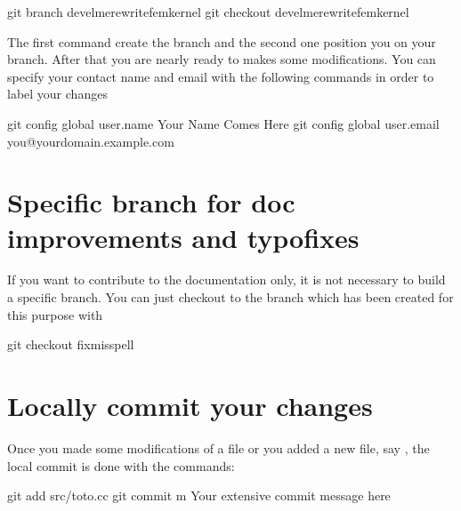 \documentclass[a4paper,11pt,english]{sphinxmanual}
\begin{document}
\begin{sphinxVerbatim}[commandchars=\\\{\}]
git branch devel\PYGZhy{}me\PYGZhy{}rewrite\PYGZhy{}fem\PYGZhy{}kernel
git checkout devel\PYGZhy{}me\PYGZhy{}rewrite\PYGZhy{}fem\PYGZhy{}kernel
\end{sphinxVerbatim}

The first command create the branch and the second one position you on your branch. After that you are nearly ready to makes some modifications. You can specify your contact name and e\sphinxhyphen{}mail with the following commands in order to label your changes

\begin{sphinxVerbatim}[commandchars=\\\{\}]
git config \PYGZhy{}\PYGZhy{}global user.name \PYGZdq{}Your Name Comes Here\PYGZdq{}
git config \PYGZhy{}\PYGZhy{}global user.email you@yourdomain.example.com
\end{sphinxVerbatim}


\section{Specific branch for doc improvements and typo\sphinxhyphen{}fixes}
\label{\detokenize{project/contribute:specific-branch-for-doc-improvements-and-typo-fixes}}
If you want to contribute to the documentation only, it is not necessary to build a specific branch. You can just checkout to the  branch which has been created for this purpose with

\begin{sphinxVerbatim}[commandchars=\\\{\}]
git checkout fixmisspell
\end{sphinxVerbatim}


\section{Locally commit your changes}
\label{\detokenize{project/contribute:locally-commit-your-changes}}
Once you made some modifications of a file or you added a new file, say , the local commit is done with the commands:

\begin{sphinxVerbatim}[commandchars=\\\{\}]
git add src/toto.cc
git commit \PYGZhy{}m \PYGZdq{}Your extensive commit message here\PYGZdq{}
\end{sphinxVerbatim}
\end{document}

